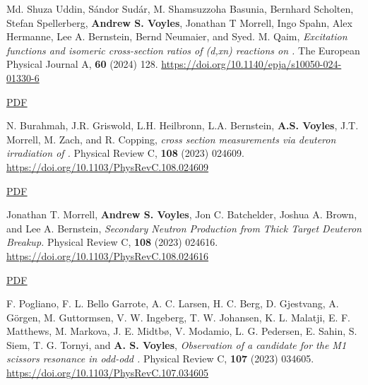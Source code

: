 \begin{bibsection}
\item Md. Shuza Uddin, Sándor Sudár, M. Shamsuzzoha Basunia, Bernhard Scholten, Stefan Spellerberg, \textbf{Andrew S. Voyles}, Jonathan T Morrell, Ingo Spahn, Alex Hermanne, Lee A. Bernstein, Bernd Neumaier, and Syed. M. Qaim, \emph{ Excitation functions and isomeric cross-section ratios of (d,xn) reactions on .} The European Physical Journal A, \textbf{60} (2024) 128. \url{https://doi.org/10.1140/epja/s10050-024-01330-6}

\ifshort \vspace{0.1cm} \href{https://avoyles.github.io/papers/Uddin2024_86Y.pdf}{\underline{PDF}} \else  \fi



\item N. Burahmah, J.R. Griswold, L.H. Heilbronn, L.A. Bernstein,  \textbf{A.S. Voyles}, J.T. Morrell, M. Zach, and R. Copping, \emph{     cross section measurements via deuteron irradiation of  .} Physical Review C, \textbf{108} (2023) 024609. \url{https://doi.org/10.1103/PhysRevC.108.024609} 

\ifshort \vspace{0.1cm} \href{https://avoyles.github.io/papers/Buramah2023_229Pa_deuterons.pdf}{\underline{PDF}} \else  \fi 

\item Jonathan T. Morrell, \textbf{Andrew S. Voyles}, Jon C. Batchelder, Joshua A. Brown, and Lee A. Bernstein, \emph{Secondary Neutron Production from Thick Target Deuteron Breakup.} Physical Review C, \textbf{108} (2023) 024616. \url{https://doi.org/10.1103/PhysRevC.108.024616}

\ifshort \vspace{0.1cm} \href{https://avoyles.github.io/papers/Morrell2023_dbreakup.pdf}{\underline{PDF}} \else  \fi




\item F. Pogliano, F. L. Bello Garrote, A. C. Larsen, H. C. Berg, D. Gjestvang, A. Görgen, M. Guttormsen, V. W. Ingeberg, T. W. Johansen, K. L. Malatji, E. F. Matthews, M. Markova, J. E. Midtbø, V. Modamio, L. G. Pedersen, E. Sahin, S. Siem, T. G. Tornyi, and \textbf{A. S. Voyles}, \emph{Observation of a candidate for the M1 scissors resonance in odd-odd .} Physical Review C, \textbf{107} (2023) 034605. \url{https://doi.org/10.1103/PhysRevC.107.034605}


\end{bibsection}
